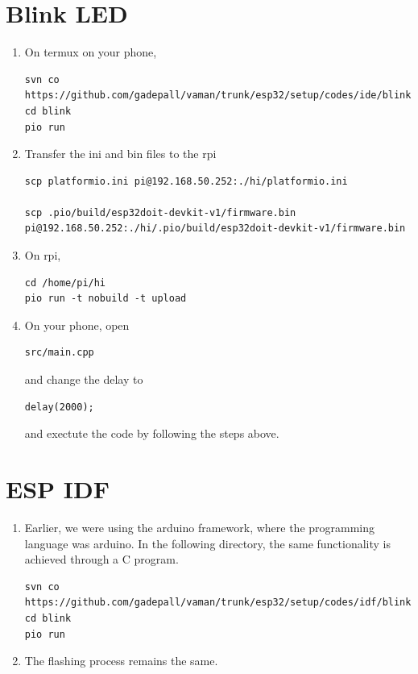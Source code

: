 \documentclass[journal,12pt,twocolumn]{IEEEtran}
\renewcommand\thesection{\arabic{section}}
\begin{document}
\section{Blink LED}
\renewcommand{\theequation}{\theenumi}
\renewcommand{\thefigure}{\theenumi}
\begin{enumerate}[label=\thesection.\arabic*.,ref=\thesection.\theenumi]
\item On termux on your phone, 
\begin{lstlisting}
svn co https://github.com/gadepall/vaman/trunk/esp32/setup/codes/ide/blink
cd blink
pio run
\end{lstlisting}
\item Transfer the ini and bin files to the rpi 
\begin{lstlisting}
scp platformio.ini pi@192.168.50.252:./hi/platformio.ini

scp .pio/build/esp32doit-devkit-v1/firmware.bin pi@192.168.50.252:./hi/.pio/build/esp32doit-devkit-v1/firmware.bin
\end{lstlisting}
\item On rpi,
\begin{lstlisting}
cd /home/pi/hi
pio run -t nobuild -t upload
\end{lstlisting}
\item On your phone, open 
\begin{lstlisting}
src/main.cpp 
\end{lstlisting}
and change the delay to 
\begin{lstlisting}
delay(2000);
\end{lstlisting}
and exectute the code by following the steps above.
\end{enumerate}

\section{ESP IDF}
\renewcommand{\theequation}{\theenumi}
\renewcommand{\thefigure}{\theenumi}
\begin{enumerate}[label=\thesection.\arabic*.,ref=\thesection.\theenumi]
\item Earlier, we were using the arduino framework, where the programming language was arduino.  In the following directory, the same functionality is achieved through a C program.
\begin{lstlisting}
svn co https://github.com/gadepall/vaman/trunk/esp32/setup/codes/idf/blink
cd blink
pio run
\end{lstlisting}
\item The flashing process remains the same.
\end{enumerate}
\end{document}
